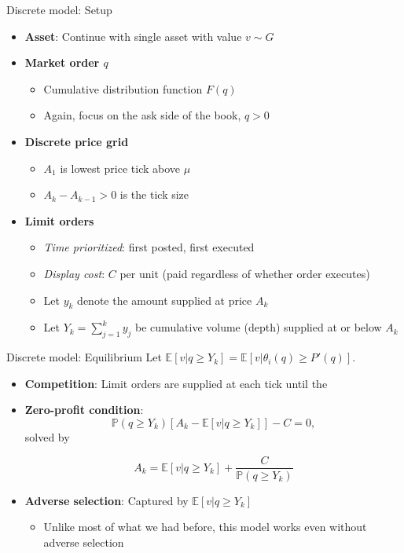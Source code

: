 \documentclass[english,10pt]{beamer}
\begin{document}
\begin{frame}{Discrete model: Setup}
	\begin{itemize}
		\item \textbf{Asset}: Continue with single asset with value $v \sim G$
		\item \textbf{Market order $q$}
		\begin{itemize}
			\item Cumulative distribution function $F(q)$
			\item Again, focus on the ask side of the book, $q>0$
		\end{itemize}
		\item \textbf{Discrete price grid}
		\begin{itemize}
			\item $A_1$ is lowest price tick above $\mu$
			\item $A_k-A_{k-1}>0$ is the tick size
		\end{itemize}
		\item \textbf{Limit orders}
		\begin{itemize}
			\item \textit{Time prioritized}: first posted, first executed
			\item \textit{Display cost}: $C$ per unit (paid regardless of whether order executes)
			\item Let $y_k$ denote the amount supplied at price $A_k$
			\item Let $Y_k=\sum_{j=1}^k y_j$ be cumulative volume (depth) supplied at or below $A_k$
		\end{itemize}
	\end{itemize}
\end{frame}


\begin{frame}{Discrete model: Equilibrium}
	Let $\mathbb{E}[v|q \geq Y_k]=\mathbb{E}[v|\theta_i(q) \geq P'(q)]$.
	\begin{itemize}
		\item \textbf{Competition}: Limit orders are supplied at each tick until the 
		\item \textbf{Zero-profit condition}:
		\[
		\mathbb{P}(q \geq Y_k)[A_k-\mathbb{E}[v|q \geq Y_k]] - C = 0,
		\]
		solved by
		\begin{block}{}
			\[
			A_k = \mathbb{E}[v| q \geq Y_k] + \frac{C}{\mathbb{P}(q\geq Y_k)}
			\]
		\end{block}
		\item \textbf{Adverse selection}: Captured by  $\mathbb{E}[v| q \geq Y_k] $
		\begin{itemize}
			\item Unlike most of what we had before, this model works even without adverse selection
		\end{itemize}
	\end{itemize}
\end{frame}
\end{document}
